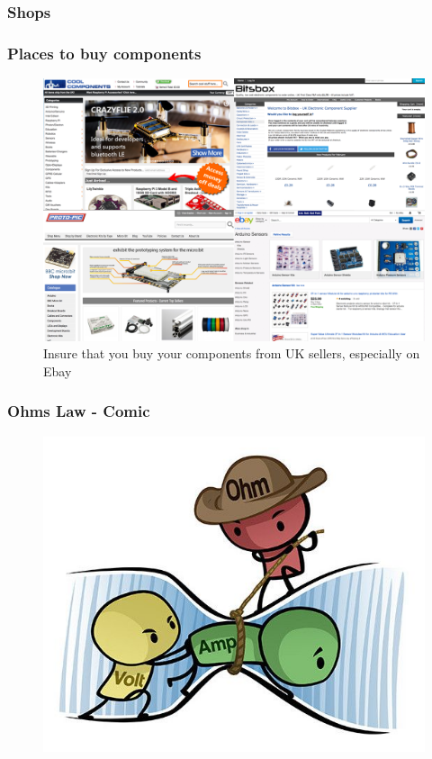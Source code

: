 

\begin{frame}
	\frametitle{Shops}
	\frametitle{Places to buy components}
	\begin{figure}
		\includegraphics[scale=.25]{assets/shops} 
		\caption{Insure that you buy your components from UK sellers, especially on Ebay}
	\end{figure}
\end{frame}




\begin{frame}
 	\frametitle{Ohms Law - Comic}
   	\begin{figure}
   		\includegraphics[scale=.3]{assets/ohm} 
	\end{figure}
\end{frame}




